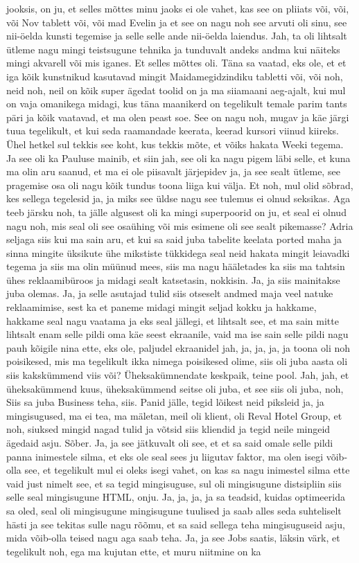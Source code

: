 jooksis, on ju, et selles mõttes minu jaoks ei ole vahet, kas see on pliiats või, või, või Nov tablett või, või mad Evelin ja et see on nagu noh see arvuti oli sinu, see nii-öelda kunsti tegemise ja selle selle ande nii-öelda laiendus. Jah, ta oli lihtsalt ütleme nagu mingi teistsugune tehnika ja tunduvalt andeks andma kui näiteks mingi akvarell või mis iganes. Et selles mõttes oli.
Täna sa vaatad, eks ole, et et iga kõik kunstnikud kasutavad mingit Maidamegidzindiku tabletti või, või noh, neid noh, neil on kõik super ägedat toolid on ja ma siiamaani aeg-ajalt, kui mul on vaja omanikega midagi, kus täna maanikerd on tegelikult temale parim tants päri ja kõik vaatavad, et ma olen peast soe. See on nagu noh, mugav ja käe järgi tuua tegelikult, et kui seda raamandade keerata, keerad kursori viinud kiireks. Ühel hetkel sul tekkis see koht, kus tekkis mõte, et võiks hakata Weeki tegema. Ja see oli ka Pauluse mainib, et siin jah, see oli ka nagu pigem läbi selle, et kuna ma olin aru saanud, et ma ei ole piisavalt järjepidev ja, ja see sealt ütleme, see pragemise osa oli nagu kõik tundus toona liiga kui välja. Et noh, mul olid sõbrad, kes sellega tegelesid ja, ja miks see üldse nagu see tulemus ei olnud seksikas. Aga teeb järsku noh, ta jälle algusest oli ka mingi superpoorid on ju, et seal ei olnud nagu noh, mis seal oli see osaühing või mis esimene oli see sealt pikemasse? Adria seljaga siis kui ma sain aru, et kui sa said juba tabelite keelata ported maha ja sinna mingite üksikute ühe mikstiste tükkidega seal neid hakata mingit leiavadki tegema ja siis ma olin müünud mees, siis ma nagu hääletades ka siis ma tahtsin ühes reklaamibüroos ja midagi sealt katsetasin, nokkisin. Ja, ja siis mainitakse juba olemas. Ja, ja selle asutajad tulid siis otseselt andmed maja veel natuke reklaamimise, sest ka et paneme midagi mingit seljad kokku ja hakkame, hakkame seal nagu vaatama ja eks seal jällegi, et lihtsalt see, et ma sain mitte lihtsalt enam selle pildi oma käe seest ekraanile, vaid ma ise sain selle pildi nagu pauh kõigile nina ette, eks ole, paljudel ekraanidel jah, ja, ja, ja, ja toona oli noh poisikesed, mis ma tegelikult ikka nimega poisikesed olime, siis oli juba aasta oli siis kakskümmend viis või? Üheksakümnendate keskpaik, teine pool. Jah, jah, et üheksakümmend kuus, üheksakümmend seitse oli juba, et see siis oli juba, noh, Siis sa juba Business teha, siis. Panid jälle, tegid lõikest neid piksleid ja, ja mingisugused, ma ei tea, ma mäletan, meil oli klient, oli Reval Hotel Group, et noh, siuksed mingid nagad tulid ja võtsid siis kliendid ja tegid neile mingeid ägedaid asju. Sõber. Ja, ja see jätkuvalt oli see, et et sa said omale selle pildi panna inimestele silma, et eks ole seal sees ju liigutav faktor, ma olen isegi võib-olla see, et tegelikult mul ei oleks isegi vahet, on kas sa nagu inimestel silma ette vaid just nimelt see, et sa tegid mingisuguse, sul oli mingisugune distsipliin siis selle seal mingisugune HTML, onju. Ja, ja, ja, ja sa teadsid, kuidas optimeerida sa oled, seal oli mingisugune mingisugune tuulised ja saab alles seda suhteliselt hästi ja see tekitas sulle nagu rõõmu, et sa said sellega teha mingisuguseid asju, mida võib-olla teised nagu aga saab teha. Ja, ja see Jobs saatis, läksin värk, et tegelikult noh, ega ma kujutan ette, et muru niitmine on ka 